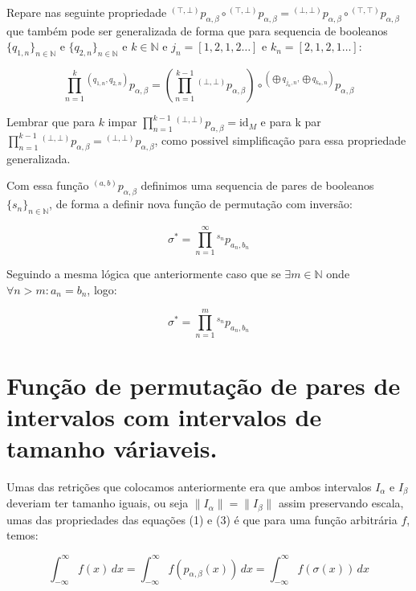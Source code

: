 \documentclass[12pt,a4paper]{article}
\begin{document}
Repare nas seguinte propriedade ${}^{(\top,\bot)}p_{\alpha,\beta} \circ {}^{(\top,\bot)}p_{\alpha,\beta} = {}^{(\bot,\bot)}p_{\alpha,\beta} \circ {}^{(\top,\top)}p_{\alpha,\beta}$
que também pode ser generalizada de forma que para sequencia de booleanos $\{q_{1,n}\}_{n\in\mathbb{N}}$ e 
$\{q_{2,n}\}_{n\in\mathbb{N}}$ e $k \in\mathbb{N}$ e ${j_n = [1,2,1,2 \dots]}$ e ${k_n = [2,1,2,1 \dots]}$:

\begin{equation}
   \prod_{n=1}^{k} {}^{(q_{1,n}, q_{2,n})}p_{\alpha,\beta} = (\prod_{n=1}^{k-1} {}^{(\bot, \bot)}p_{\alpha,\beta}) \circ {}^{(\bigoplus q_{j_n,n}, \bigoplus q_{k_n,n})}p_{\alpha,\beta}
\end{equation}

Lembrar que para $k$ impar $\prod_{n=1}^{k-1} {}^{(\bot, \bot)}p_{\alpha,\beta} = \text{id}_M$ e para k par $\prod_{n=1}^{k-1} {}^{(\bot, \bot)}p_{\alpha,\beta} = {}^{(\bot, \bot)}p_{\alpha,\beta}$, como possivel simplificação
para essa propriedade generalizada. 
\vspace{0.5cm}

Com essa função ${}^{(a,b)}p_{\alpha,\beta}$ definimos uma sequencia de pares de booleanos $\{s_n\}_{n\in\mathbb{N}}$, de forma a definir nova função de permutação com inversão:

\begin{equation}
   \sigma^{*} = \prod_{n=1}^{\infty} {}^{s_n}p_{a_n,b_n}
\end{equation}

Seguindo a mesma lógica que anteriormente caso que se $\exists m \in \mathbb{N}$ onde $\forall n > m : a_n=b_n$, logo:

\begin{equation}
   \sigma^{*}  = \prod_{n=1}^{m} {}^{s_n}p_{a_n,b_n}
\end{equation}

\section{Função de permutação de pares de intervalos com intervalos de tamanho váriaveis.}

Umas das retrições que colocamos anteriormente era que ambos intervalos $I_{\alpha}$ e $I_{\beta}$ deveriam ter tamanho iguais, ou seja $\|I_{\alpha}\|=\|I_{\beta}\|$
assim preservando escala, umas das propriedades das equações (1) e (3) é que para uma função arbitrária $f$, temos:

\begin{equation}
   \int_{-\infty}^{\infty} f(x)\, dx = \int_{-\infty}^{\infty} f(p_{\alpha, \beta}(x))\, dx = \int_{-\infty}^{\infty} f(\sigma(x))\, dx
\end{equation}
\end{document}
